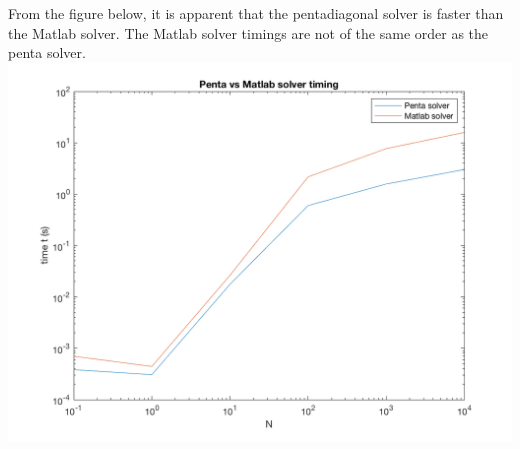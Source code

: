 \documentclass[10pt,a4paper]{article}
\begin{document}
\section{}
From the figure below, it is apparent that the pentadiagonal solver is faster than the Matlab solver. The Matlab solver timings are not of the same order as the penta solver.  \\

\noindent
\includegraphics[scale=0.3]{penta_mat_time.png}

\section{}
\section{}
\section{}
\end{document}

